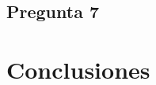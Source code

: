 \documentclass[letter,10pt]{article}
\begin{document}
 

\newpage
\subsection{Pregunta 7}





\section{Conclusiones}




%
%

\end{document}
